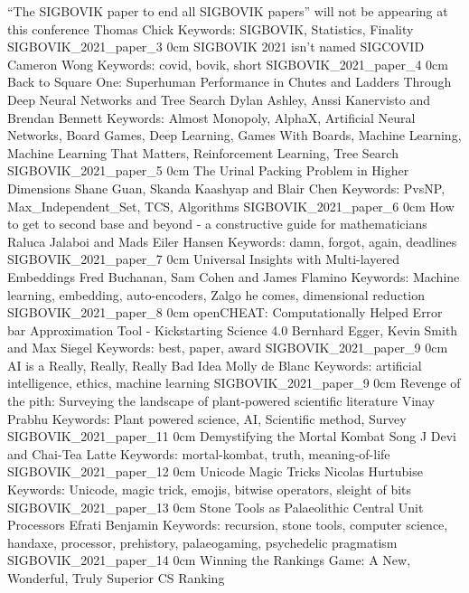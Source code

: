 \addpaper
	{``The SIGBOVIK paper to end all SIGBOVIK papers'' will not be appearing at this conference}
	{Thomas Chick}
	{Keywords: SIGBOVIK, Statistics, Finality}
	{SIGBOVIK_2021_paper_3}
	{0cm}
	{}
\addpaper
	{SIGBOVIK 2021 isn't named SIGCOVID}
	{Cameron Wong}
	{Keywords: covid, bovik, short}
	{SIGBOVIK_2021_paper_4}
	{0cm}
	{}
\addpaper
	{Back to Square One: Superhuman Performance in Chutes and Ladders Through Deep Neural Networks and Tree Search}
	{Dylan Ashley, Anssi Kanervisto and Brendan Bennett}
	{Keywords: Almost Monopoly, AlphaX, Artificial Neural Networks, Board Games, Deep Learning, Games With Boards, Machine Learning, Machine Learning That Matters, Reinforcement Learning, Tree Search}
	{SIGBOVIK_2021_paper_5}
	{0cm}
	{}
\addpaper
	{The Urinal Packing Problem in Higher Dimensions}
	{Shane Guan, Skanda Kaashyap and Blair Chen}
	{Keywords: PvsNP, Max_Independent_Set, TCS, Algorithms}
	{SIGBOVIK_2021_paper_6}
	{0cm}
	{}
\addpaper
	{How to get to second base and beyond - a constructive guide for mathematicians}
	{Raluca Jalaboi and Mads Eiler Hansen}
	{Keywords: damn, forgot, again, deadlines}
	{SIGBOVIK_2021_paper_7}
	{0cm}
	{}
\addpaper
	{Universal Insights with Multi-layered Embeddings}
	{Fred Buchanan, Sam Cohen and James Flamino}
	{Keywords: Machine learning, embedding, auto-encoders, Zalgo he comes, dimensional reduction}
	{SIGBOVIK_2021_paper_8}
	{0cm}
	{}
\addpaper
	{openCHEAT: Computationally Helped Error bar Approximation Tool - Kickstarting Science 4.0}
	{Bernhard Egger, Kevin Smith and Max Siegel}
	{Keywords: best, paper, award}
	{SIGBOVIK_2021_paper_9}
	{0cm}
	{}
\addpaper
	{AI is a Really, Really, Really Bad Idea}
	{Molly de Blanc}
	{Keywords: artificial intelligence, ethics, machine learning}
	{SIGBOVIK_2021_paper_9}
	{0cm}
	{}
\addpaper
	{Revenge of the pith: Surveying the landscape of plant-powered scientific literature}
	{Vinay Prabhu}
	{Keywords: Plant powered science, AI, Scientific method, Survey}
	{SIGBOVIK_2021_paper_11}
	{0cm}
	{}
\addpaper
	{Demystifying the Mortal Kombat Song}
	{J Devi and Chai-Tea Latte}
	{Keywords: mortal-kombat, truth, meaning-of-life}
	{SIGBOVIK_2021_paper_12}
	{0cm}
	{}
\addpaper
	{Unicode Magic Tricks}
	{Nicolas Hurtubise}
	{Keywords: Unicode, magic trick, emojis, bitwise operators, sleight of bits}
	{SIGBOVIK_2021_paper_13}
	{0cm}
	{}
\addpaper
	{Stone Tools as Palaeolithic Central Unit Processors}
	{Efrati Benjamin}
	{Keywords: recursion, stone tools, computer science, handaxe, processor, prehistory, palaeogaming, psychedelic pragmatism}
	{SIGBOVIK_2021_paper_14}
	{0cm}
	{}
\addpaper
	{Winning the Rankings Game: A New, Wonderful, Truly Superior CS Ranking}
